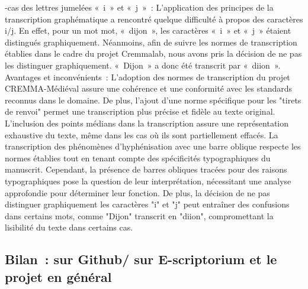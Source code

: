 \documentclass[12pt,a4paper,oneside,titlepage]{article} %
\begin{document}
-cas des lettres jumelées « i » et « j » : L’application des principes de la transcription graphématique a rencontré quelque difficulté à propos des caractères i/j. En effet, pour un mot mot, « dijon », les caractères « i » et « j » étaient distingués graphiquement. Néanmoins, afin de suivre les normes de transcription établies dans le cadre du projet Cremmalab, nous avons pris la décision de ne pas les distinguer graphiquement. « Dijon » a donc été transcrit par « diion ».
Avantages et inconvénients : L'adoption des normes de transcription du projet CREMMA-Médiéval assure une cohérence et une conformité avec les standards reconnus dans le domaine. De plus, l'ajout d'une norme spécifique pour les "tirets de renvoi" permet une transcription plus précise et fidèle au texte original. L'inclusion des points médians dans la transcription assure une représentation exhaustive du texte, même dans les cas où ils sont partiellement effacés. La transcription des phénomènes d'hyphénisation avec une barre oblique respecte les normes établies tout en tenant compte des spécificités typographiques du manuscrit. Cependant, la présence de barres obliques tracées pour des raisons typographiques pose la question de leur interprétation, nécessitant une analyse approfondie pour déterminer leur fonction. De plus, la décision de ne pas distinguer graphiquement les caractères "i" et "j" peut entraîner des confusions dans certains mots, comme "Dijon" transcrit en "diion", compromettant la lisibilité du texte dans certains cas.

\subsection{Bilan : sur Github/ sur E-scriptorium et le projet en général}
\end{document}
